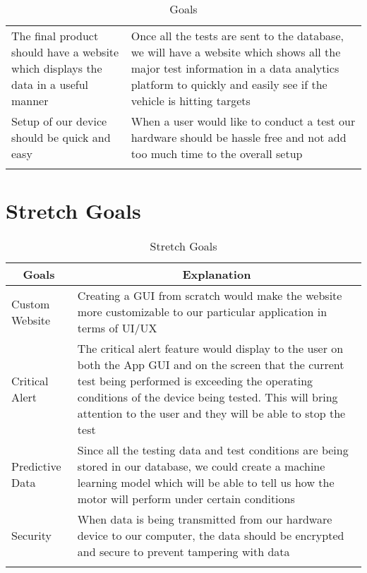 \documentclass[12pt,titlepage]{article}
\begin{document}
\begin{longtable}{|p{6cm}|p{10cm}|}
    \newline                                
    \\ \hline
    The final product should have a website which displays the data in a useful manner                                
    & Once all the  tests are sent to the database, we will have a website which shows all the major test information in a data analytics platform to quickly and easily see if the vehicle is hitting targets  
    \newline                              
    \\ \hline
    Setup of our device should be quick and easy                               
    & When a user would like to conduct a test our hardware should be hassle free and not add too much time to the overall setup
    \newline                            
    \\ \hline
    \caption{Goals}
    \end{longtable}
  
    
\section{Stretch Goals}
    \begin{longtable}{|p{6cm}|p{10cm}|}
        
        \hline
        \multicolumn{1}{|c|}{\textbf{Goals}} & \multicolumn{1}{c|}{\textbf{Explanation}} 
        \\ \hline
        Custom Website
        &  Creating a GUI from scratch would make the website more customizable to our particular application in terms of UI/UX   
        \newline                              
        \\ \hline
        Critical Alert                              
        & The critical alert feature would display to the user on both the App GUI and on the screen that the current test being performed is exceeding the operating conditions of the device being tested. This will bring attention to the user and they will be able to stop the test
        \newline
        \\ \hline
        Predictive Data                              
        & Since all the testing data and test conditions are being stored in our database, we could create a machine learning model which will be able to tell us how the motor will perform under certain conditions                         
        \newline       
        \\ \hline
        Security                              
        & When data is being transmitted from our hardware device to our computer, the data should be encrypted and secure to prevent tampering with data
        \newline                           
        \\ 
        \hline
        \caption{Stretch Goals}
    \end{longtable}
\end{document}
